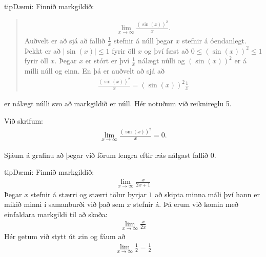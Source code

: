 \documentclass[a4paper,10pt,icelandic]{sphinxmanual}
\begin{document}
\begin{sphinxadmonition}{tip}{Dæmi:}
Finnið markgildið:
\begin{quote}
\begin{equation*}
\begin{split}\lim_{x\to \infty}\frac{(\sin(x))^2}{x}.\end{split}
\end{equation*}
Auðvelt er að sjá að fallið \(\frac{1}{x}\) stefnir á núll þegar \(x\) stefnir á óendanlegt.
Þekkt er að \(|\sin(x)|\leq 1\) fyrir öll \(x\) og því fæst að \(0\leq (\sin(x))^2 \leq 1\) fyrir öll \(x\).
Þegar \(x\) er stórt er því \(\frac{1}{x}\) nálægt núlli og \((\sin(x))^2\) er á milli núll og einn.
En þá er auðvelt að sjá að
\begin{equation*}
\begin{split}\frac{(\sin(x))^2}{x}=(\sin(x))^2\frac{1}{x}\end{split}
\end{equation*}\end{quote}

er nálægt núlli svo að markgildið er núll. Hér notuðum við reiknireglu 5.

Við skrifum:
\begin{equation*}
\begin{split}\lim_{x\to\infty}\frac{(\sin(x))^2}{x}=0.\end{split}
\end{equation*}
\begin{figure}[H]
\centering

\noindent{}
\end{figure}

Sjáum á grafinu að þegar við förum lengra eftir \(x\)\sphinxhyphen{}ás nálgast fallið \(0\).
\end{sphinxadmonition}

\begin{sphinxadmonition}{tip}{Dæmi:}
Finnið markgildið:
\begin{equation*}
\begin{split}\lim_{x\to \infty} \frac{x}{2x+1}\end{split}
\end{equation*}
Þegar \(x\) stefnir á stærri og stærri tölur byrjar \(1\) að skipta minna máli því hann er mikið minni í samanburði við það sem \(x\) stefnir á. Þá erum við komin með einfaldara markgildi til að skoða:
\begin{equation*}
\begin{split}\lim_{x\to \infty} \frac{x}{2x}\end{split}
\end{equation*}
Hér getum við stytt út \(x\)\sphinxhyphen{}in og fáum að
\begin{equation*}
\begin{split}\lim_{x\to \infty} \frac{1}{2} = \frac{1}{2}\end{split}
\end{equation*}
\end{sphinxadmonition}
\end{document}
